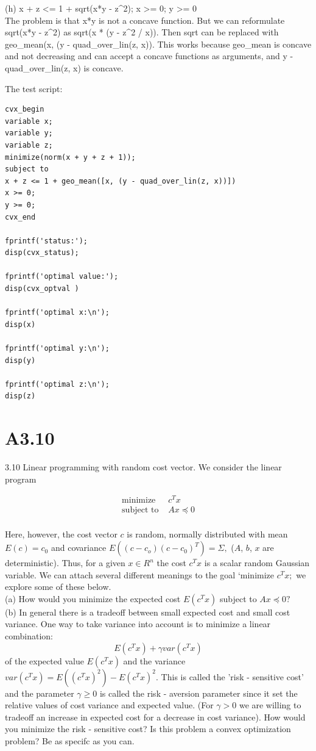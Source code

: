 \documentclass{article}
\begin{document}
(h) x + z <= 1 + sqrt(x*y - z\^{}2); x \textgreater= 0; y \textgreater= 0\\

The problem is that x*y is not a concave function. But we can reformulate sqrt(x*y - z\^{}2) as sqrt(x * (y - z\^{}2 / x)). Then sqrt can be replaced with geo\_mean(x, (y - quad\_over\_lin(z, x)). This works because geo\_mean is concave and not decreasing and can accept a concave functions as arguments, and  y - quad\_over\_lin(z, x) is concave.

The test script:\\
\begin{verbatim}
cvx_begin
variable x;
variable y;
variable z;
minimize(norm(x + y + z + 1));
subject to
x + z <= 1 + geo_mean([x, (y - quad_over_lin(z, x))])
x >= 0;
y >= 0;
cvx_end

fprintf('status:'); 
disp(cvx_status);

fprintf('optimal value:'); 
disp(cvx_optval )

fprintf('optimal x:\n'); 
disp(x)

fprintf('optimal y:\n'); 
disp(y)

fprintf('optimal z:\n'); 
disp(z)
\end{verbatim}

\section*{A3.10}

3.10 Linear programming with random cost vector. We consider the linear program 

\begin{align*}
\text{minimize } &c^T x \\
\text{subject to } &A x \preceq 0 \\
\end{align*} 

Here, however, the cost vector $c$ is random, normally distributed with mean
$E(c) = c_0$ and covariance $E((c - c_o)(c - c_0)^T) = \Sigma, $ ($A$, $b$, $x$ are deterministic). Thus, for a given $x \in R^n$ the cost $c^T x$ is a scalar random Gaussian variable. We can attach several different meanings to the goal `minimize $c^T x;$ we explore some of these below. \\

(a) How would you minimize the expected cost $E(c^T x)$ subject to 
$A x \preceq 0?$ \\

(b) In general there is a tradeoff between small expected cost and small cost variance. One way to take variance into account is to minimize a linear combination:
$$
E(c^T x) + \gamma var(c^T x)
$$
of the expected value $E(c^T x)$ and the variance 
$var(c^T x) = E((c^T x)^2) - E(c^T x)^2.$ This is called the 'risk - sensitive cost' and the parameter $\gamma \geq 0$ is called the risk - aversion parameter since it set the relative values of cost variance and expected value. (For $\gamma > 0$ we are willing to tradeoff an increase in expected cost for a decrease in cost variance). How would you minimize the risk - sensitive cost? Is this problem a convex optimization problem? Be as specifc as you can. \\
\end{document}
